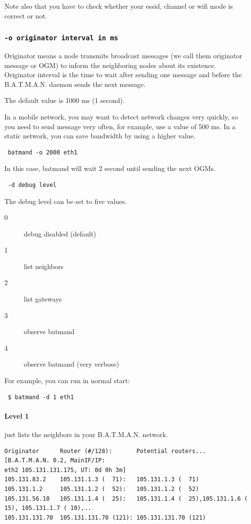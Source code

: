 \documentclass[
	12pt,
	a4paper,
	twoside,
	english,
	headsepline,
	footnosepline,
	automark,
	normalheadings,
	openany,
	cleardoubleplain,
	abstracton,
	idxtotoc,
	liststotoc,
	bibtotoc,
 	BCOR8mm,
]{scrartcl}
\newcommand{\subsubsectionttt}[1]{\subsubsection{\texttt{#1}}}
\begin{document}
Note also that you have to check whether your essid, channel or wifi mode is correct or not.

\subsubsectionttt{-o originator interval in ms}
 Originator means a node transmits broadcast messages (we call them originator message or OGM) to inform the neighboring nodes about its existence. Originator interval is the time to wait after sending one message and before the B.A.T.M.A.N. daemon sends the next message.

The default value is 1000 ms (1 second).

In a mobile network, you may want to detect network changes very quickly, so you need to send message very often, for example, use a value of 500 ms. In a static network, you can save bandwidth by using a higher value.
\begin{verbatim} batmand -o 2000 eth1\end{verbatim}
In this case, batmand will wait 2 second until sending the next OGMs.

\begin{verbatim} -d debug level\end{verbatim}
The debug level can be set to five values.

\begin{description}
 \item[0] debug disabled (default)
 \item[1] list neighbors
 \item[2] list gateways
 \item[3] observe batmand
 \item[4] observe batmand (very verbose)
\end{description}

For example, you can run in normal start:
\begin{verbatim}
 $ batmand -d 1 eth1
\end{verbatim}

\paragraph*{Level 1}
just lists the neighbors in your B.A.T.M.A.N. network.

\begin{lstlisting}[basicstyle=\footnotesize,	frame=single, columns= flexible]
Originator      Router (#/128):       Potential routers... [B.A.T.M.A.N. 0.2, MainIF/IP:
eth2 105.131.131.175, UT: 0d 0h 3m]
105.131.83.2    105.131.1.3 (  71):   105.131.1.3 (  71)
105.131.1.2     105.131.1.2 (  52):   105.131.1.2 (  52)
105.131.56.10   105.131.1.4 (  25):   105.131.1.4 (  25),105.131.1.6 ( 15), 105.131.1.7 ( 10),..
105.131.131.70  105.131.131.70 (121): 105.131.131.70 (121)
\end{lstlisting}
\end{document}
